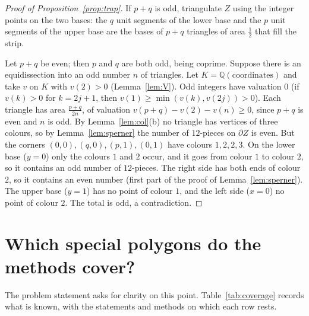 \documentclass[11pt]{article}
\theoremstyle{definition}
\newcommand{\Q}{\mathbb{Q}}
\begin{document}
\begin{proof}[Proof of Proposition~\ref{prop:trap}]
If $p+q$ is odd, triangulate $Z$ using the integer points on the two bases: the $q$ unit segments of
the lower base and the $p$ unit segments of the upper base are the bases of $p+q$ triangles of area
$\tfrac12$ that fill the strip.

Let $p+q$ be even; then $p$ and $q$ are both odd, being coprime. Suppose there is an equidissection
into an odd number $n$ of triangles. Let $K=\Q(\text{coordinates})$ and take $v$ on $K$ with $v(2)>0$
(Lemma~\ref{lem:V}). Odd integers have valuation $0$ (if $v(k)>0$ for $k=2j+1$, then
$v(1)\ge\min(v(k),v(2j))>0$). Each triangle has area $\frac{p+q}{2n}$, of valuation
$v(p+q)-v(2)-v(n)\ge0$, since $p+q$ is even and $n$ is odd. By Lemma~\ref{lem:col}(b) no triangle
has vertices of three colours, so by Lemma~\ref{lem:sperner} the number of $12$-pieces on
$\partial Z$ is even. But the corners $(0,0),(q,0),(p,1),(0,1)$ have colours $1,2,2,3$. On the lower
base ($y=0$) only the colours $1$ and $2$ occur, and it goes from colour $1$ to colour $2$, so it
contains an odd number of $12$-pieces. The right side has both ends of colour $2$, so it contains an
even number (first part of the proof of Lemma~\ref{lem:sperner}). The upper base ($y=1$) has no point
of colour $1$, and the left side ($x=0$) no point of colour $2$. The total is odd, a contradiction.
\end{proof}

\section{Which special polygons do the methods cover?}\label{sec:scope}

The problem statement asks for clarity on this point. Table~\ref{tab:coverage} records what is
known, with the statements and methods on which each row rests.
\end{document}
